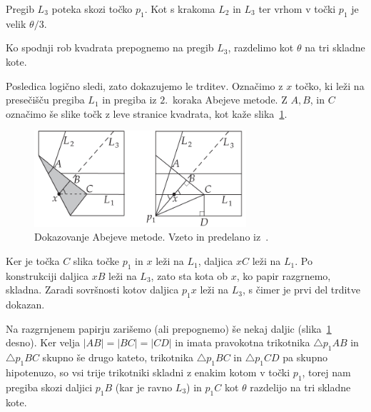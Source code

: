
\begin{trditev}
    Pregib $L_3$ poteka skozi točko $p_1$. Kot s krakoma $L_2$ in $L_3$ ter vrhom v točki $p_1$ je velik $\theta/3$.
\end{trditev}
\begin{posledica}
    Ko spodnji rob kvadrata prepognemo na pregib $L_3$, razdelimo kot $\theta$ na tri skladne kote.
\end{posledica}

\begin{dokaz}
    Posledica logično sledi, zato dokazujemo le trditev. Označimo z $x$ točko, ki leži na presečišču pregiba $L_1$ in pregiba iz $2$.\ koraka Abejeve metode. Z $A, B$, in $C$ označimo še slike točk z leve stranice kvadrata, kot kaže slika~\ref{fig:abe_2}.
    \begin{figure}[h]
        \centering
        \includegraphics[width=0.7\textwidth]{images/starogr_problemi/abe_trisekcija.png}
        \caption[Abejeva metoda ($2$.\ del)]{Dokazovanje Abejeve metode. Vzeto in predelano iz~\cite[str.\ 65]{hull2013}.}
        \label{fig:abe_2}
    \end{figure}
    Ker je točka $C$ slika točke $p_1$ in $x$ leži na $L_1$, daljica $xC$ leži na $L_1$. Po konstrukciji daljica $xB$ leži na $L_3$, zato sta kota ob $x$, ko papir razgrnemo, skladna. Zaradi sovršnosti kotov daljica $p_1x$ leži na $L_3$, s čimer je prvi del trditve dokazan.
    
    Na razgrnjenem papirju zarišemo (ali prepognemo) še nekaj daljic (slika~\ref{fig:abe_2} desno). Ker velja $|AB| = |BC| = |CD|$ in imata pravokotna trikotnika $\triangle p_1AB$ in $\triangle p_1BC$ skupno še drugo kateto, trikotnika $\triangle p_1BC$ in $\triangle p_1CD$ pa skupno hipotenuzo, so vsi trije trikotniki skladni z enakim kotom v točki $p_1$, torej nam pregiba skozi daljici $p_1B$ (kar je ravno $L_3$) in $p_1C$ kot $\theta$ razdelijo na tri skladne kote.
\end{dokaz}

